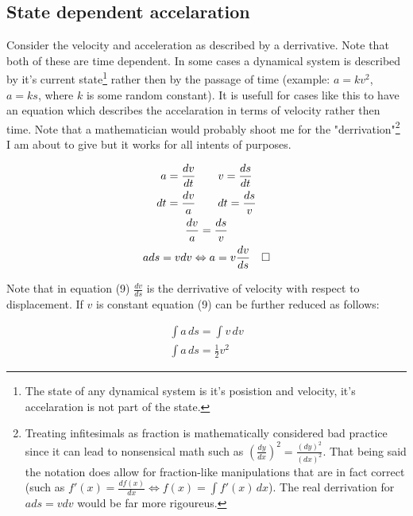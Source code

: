 \documentclass[11pt, a4paper]{article}
\newcommand*{\qed}{\hfill\ensuremath{\quad\square}}%
\begin{document}
\subsection{State dependent accelaration}
Consider the velocity and acceleration as described by a derrivative. Note that both
of these are time dependent. In some cases a dynamical system is described by it's current state\footnote{The state
of any dynamical system is it's posistion and velocity, it's accelaration is not part of the state.}
rather then by the passage of time (example: $a=kv^2$, $a = ks$, where $k$ is some random constant). It is usefull 
for cases like this to have an equation which describes the accelaration in terms of velocity rather then time. 
Note that a mathematician would probably shoot me for the "derrivation"\footnote{Treating infitesimals as fraction is mathematically considered
bad practice since it can lead to nonsensical math such as $\left(\frac{dy}{dx}\right)^2 = \frac{(dy)^2}{(dx)^2}$. That being said the notation does allow for
fraction-like manipulations that are in fact correct (such as $f'(x) = \frac{df(x)}{dx} \Leftrightarrow f(x) = \int f'(x)\,dx$). The real derrivation for
$ads = vdv$ would be far more rigoureus.} 
I am about to give but it works for all intents of purposes.

\begin{gather}
    a = \frac{dv}{dt} \qquad v = \frac{ds}{dt} \\
    dt = \frac{dv}{a} \qquad dt = \frac{ds}{v} \\
    \frac{dv}{a} = \frac{ds}{v}\\
    ads = vdv \Leftrightarrow a = v\frac{dv}{ds} \qed
\end{gather}

Note that in equation (9) $\frac{dv}{ds}$ is the derrivative of velocity with respect to displacement.
If $v$ is constant equation (9) can be further reduced as follows:

\begin{gather}
    \int a\,ds = \int v \, dv \\
    \int a\,ds = \frac{1}{2}v^2
\end{gather}
\end{document}
